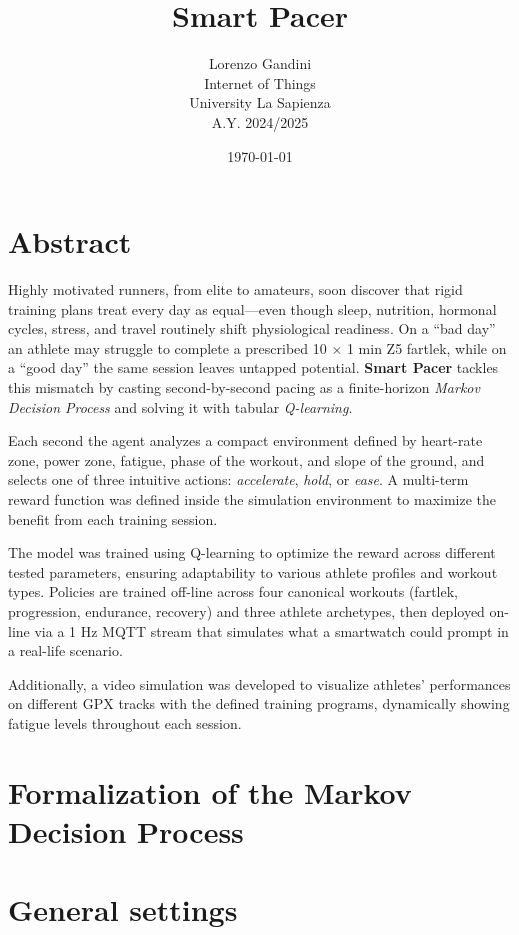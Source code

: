 \documentclass[a4paper,12pt]{article}
\title{Smart Pacer}
\author{Lorenzo Gandini \\ Internet of Things \\ University La Sapienza \\ A.Y. 2024/2025}
\date{\today}
\begin{document}
\maketitle

\newpage

\tableofcontents
\newpage

\section{Abstract}\label{abstract}
Highly motivated runners, from elite to amateurs, soon discover that rigid training plans treat every day as equal—even though sleep, nutrition, hormonal cycles, stress, and travel routinely shift physiological readiness. On a “bad day” an athlete may struggle to complete a prescribed 10 × 1 min Z5 fartlek, while on a “good day” the same session leaves untapped potential.  
\textbf{Smart Pacer} tackles this mismatch by casting second-by-second pacing as a finite-horizon \emph{Markov Decision Process} and solving it with tabular \emph{Q-learning}. 

Each second the agent analyzes a compact environment defined by heart-rate zone, power zone, fatigue, phase of the workout, and slope of the ground, and selects one of three intuitive actions: \emph{accelerate}, \emph{hold}, or \emph{ease}. A multi-term reward function was defined inside the simulation environment to maximize the benefit from each training session.

The model was trained using Q-learning to optimize the reward across different tested parameters, ensuring adaptability to various athlete profiles and workout types. Policies are trained off-line across four canonical workouts (fartlek, progression, endurance, recovery) and three athlete archetypes, then deployed on-line via a 1 Hz MQTT stream that simulates what a smartwatch could prompt in a real-life scenario.

Additionally, a video simulation was developed to visualize athletes' performances on different GPX tracks with the defined training programs, dynamically showing fatigue levels throughout each session.


\section{Formalization of the Markov Decision Process}\label{sec:methodology}


\newpage
\section{General settings}\label{sec:settings}

\end{document}
